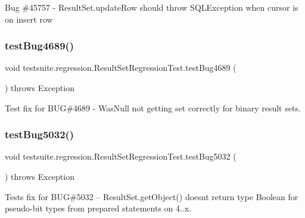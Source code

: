 Bug \#45757 -\/ Result\+Set.\+update\+Row should throw S\+Q\+L\+Exception when cursor is on insert row \mbox{\label{classtestsuite_1_1regression_1_1_result_set_regression_test_a57d92d98b7d1e7401db796d58e650a2b}} 
\subsubsection{\texorpdfstring{test\+Bug4689()}{testBug4689()}}
{\footnotesize\ttfamily void testsuite.\+regression.\+Result\+Set\+Regression\+Test.\+test\+Bug4689 (\begin{DoxyParamCaption}{ }\end{DoxyParamCaption}) throws Exception}

Test fix for B\+UG\#4689 -\/ Was\+Null not getting set correctly for binary result sets. \mbox{\label{classtestsuite_1_1regression_1_1_result_set_regression_test_a647daf219a6f3bba85706fa0aad0ca76}} 
\subsubsection{\texorpdfstring{test\+Bug5032()}{testBug5032()}}
{\footnotesize\ttfamily void testsuite.\+regression.\+Result\+Set\+Regression\+Test.\+test\+Bug5032 (\begin{DoxyParamCaption}{ }\end{DoxyParamCaption}) throws Exception}

Tests fix for B\+UG\#5032 -- Result\+Set.\+get\+Object() doesn\textquotesingle{}t return type Boolean for pseudo-\/bit types from prepared statements on 4..\+x.


